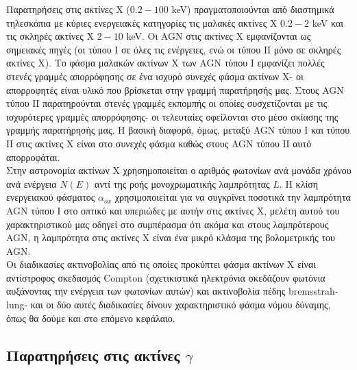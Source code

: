 Παρατηρήσεις στις ακτίνες Χ ($0.2-100$ \textlatin{keV}) πραγματοποιούνται από διαστημικά τηλεσκόπια με κύριες ενεργειακές κατηγορίες τις μαλακές ακτίνες Χ $0.2-2$ \textlatin{keV} και τις σκληρές ακτίνες Χ $2-10$ \textlatin{keV}. Οι \textlatin{AGN} στις ακτίνες Χ εμφανίζονται ως σημειακές πηγές (οι τύπου Ι σε όλες τις ενέργειες, ενώ οι τύπου ΙΙ μόνο σε σκληρές ακτίνες Χ). 
Το φάσμα μαλακών ακτίνων Χ των \textlatin{AGN} τύπου Ι εμφανίζει πολλές στενές γραμμές απορρόφησης σε ένα ισχυρό συνεχές φάσμα ακτίνων Χ- οι απορροφητές είναι υλικό που βρίσκεται στην γραμμή παρατήρησής μας. Στους \textlatin{AGN} τύπου ΙΙ παρατηρούνται στενές γραμμές εκπομπής οι οποίες συσχετίζονται με τις ισχυρότερες γραμμές απορρόφησης- οι τελευταίες οφείλονται στο μέσο σκίασης της γραμμής παρατήρησής μας. Η βασική διαφορά, όμως, μεταξύ \textlatin{AGN} τύπου Ι και τύπου ΙΙ στις ακτίνες Χ είναι στο συνεχές φάσμα καθώς στους \textlatin{AGN} τύπου ΙΙ αυτό απορροφάται.\\
Στην αστρονομία ακτίνων Χ χρησημοποιείται ο αριθμός φωτονίων ανά μονάδα χρόνου ανά ενέργεια $Ν(Ε)$ αντί της ροής μονοχρωματικής λαμπρότητας $L$. 
Η κλίση ενεργειακού φάσματος $\alpha_{ox}$ χρησιμοποιείται για να συγκρίνει ποσοτικά την λαμπρότητα \textlatin{AGN} τύπου Ι στο οπτικό και υπεριώδες με αυτήν στις ακτίνες Χ, μελέτη αυτού του χαρακτηριστικού μας οδηγεί στο συμπέρασμα ότι ακόμα και στους λαμπρότερους \textlatin{AGN}, η λαμπρότητα στις ακτίνες Χ είναι ένα μικρό κλάσμα της βολομετρικής του \textlatin{AGN}.\\
Οι διαδικασίες ακτινοβολίας από τις οποίες προκύπτει φάσμα ακτίνων Χ είναι αντίστροφος σκεδασμός \textlatin{Compton} (σχετικιστικά ηλεκτρόνια σκεδάζουν φωτόνια αυξάνοντας την ενέργεια των φωτονίων αυτών) και ακτινοβολία πέδης \textlatin{bremsstrahlung}- και οι δύο αυτές διαδικασίες δίνουν χαρακτηριστικό φάσμα νόμου δύναμης, όπως θα δούμε και στο επόμενο κεφάλαιο.

\subsection*{Παρατηρήσεις στις ακτίνες $\gamma$}

